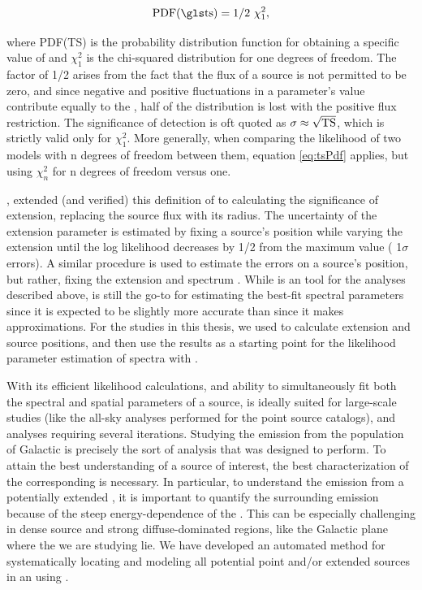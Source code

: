 \begin{equation}\label{eq:tsPdf}
\rm PDF(\ts{}) = 1/2~\chi^2_1,
\end{equation} 

where PDF(TS) is the probability distribution function for obtaining a specific value of \ts{} and $\chi^2_1$ is the chi-squared  distribution for one degrees of freedom. The factor of 1/2 arises from the fact that the flux of a source is not permitted to be zero, and since negative and positive fluctuations in a parameter's value contribute equally to the \ts{}, half of the distribution is lost with the positive flux restriction. The significance of detection is oft quoted as ${\rm \sigma \approx \sqrt{TS}}$, which is strictly valid only for $\chi^2_1$. More generally, when comparing the likelihood of two models with n degrees of freedom between them, equation \ref{eq:tsPdf} applies, but using  $\chi^2_n$ for n degrees of freedom versus one.

\cite{Lande12}, extended (and verified) this definition of \ts{} to calculating the significance of extension, replacing the source flux with its radius. The uncertainty of the extension parameter is estimated by fixing a source's position while varying the extension until the log likelihood decreases by 1/2 from the maximum value (\ie{}  1$\sigma$ errors).   A similar procedure is used to estimate the errors on a source's position, but rather,  fixing the extension and spectrum \citep{2FGL}. While \ptlike{} is an tool for the analyses described above, \gtlike{} is still the go-to for estimating the best-fit spectral parameters since it is expected to be slightly more accurate than \ptlike{} since it makes approximations. For the studies in this thesis, we used \ptlike{} to calculate extension and source positions, and then use the \ptlike{} results as a starting point for the likelihood parameter estimation of spectra with \gtlike{}.

With its efficient likelihood calculations, and ability to simultaneously fit both the spectral and spatial parameters of a source, \ptlike{} is ideally suited for large-scale studies (like the all-sky analyses performed for the \lat{} point source catalogs), and analyses requiring several iterations. Studying the \gam{} emission from the population of Galactic \snrs{} is precisely the sort of analysis that \ptlike{} was designed to perform. To attain the best understanding of a source of interest, the best characterization of the corresponding \roi{} is necessary. In particular, to understand the \gev{} emission from a potentially extended \snr{}, it is important to quantify the surrounding emission because of the steep energy-dependence of the \lat{} \psf{}. This can be especially challenging in dense source and strong diffuse-dominated regions, like the Galactic plane where the \snrs{} we are studying lie. We have developed an automated method for systematically locating and modeling all potential point and/or extended sources in an \roi{} using \ptlike{}. 

